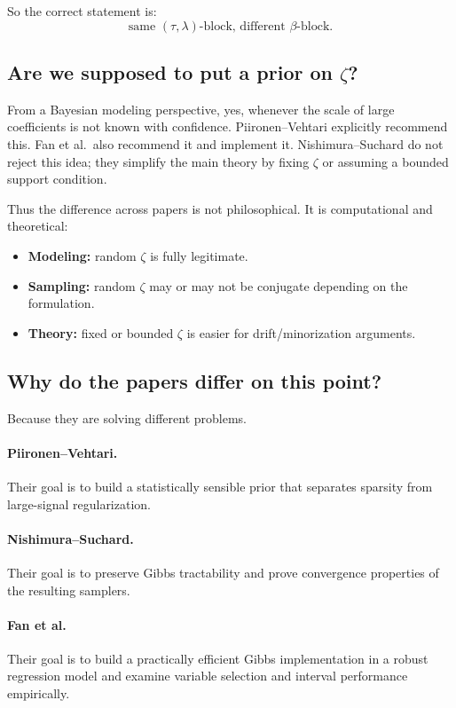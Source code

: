 \documentclass[11pt]{article}
\begin{document}
So the correct statement is:
\[
\text{same } (\tau,\lambda)\text{-block, different }\beta\text{-block.}
\]

\subsection{Are we supposed to put a prior on $\zeta$?}

From a Bayesian modeling perspective, yes, whenever the scale of large coefficients is not known with confidence. Piironen--Vehtari explicitly recommend this. Fan et al.\ also recommend it and implement it. Nishimura--Suchard do not reject this idea; they simplify the main theory by fixing $\zeta$ or assuming a bounded support condition.

Thus the difference across papers is not philosophical. It is computational and theoretical:
\begin{itemize}
\item \textbf{Modeling:} random $\zeta$ is fully legitimate.
\item \textbf{Sampling:} random $\zeta$ may or may not be conjugate depending on the formulation.
\item \textbf{Theory:} fixed or bounded $\zeta$ is easier for drift/minorization arguments.
\end{itemize}

\subsection{Why do the papers differ on this point?}

Because they are solving different problems.

\paragraph{Piironen--Vehtari.}
Their goal is to build a statistically sensible prior that separates sparsity from large-signal regularization.

\paragraph{Nishimura--Suchard.}
Their goal is to preserve Gibbs tractability and prove convergence properties of the resulting samplers.

\paragraph{Fan et al.}
Their goal is to build a practically efficient Gibbs implementation in a robust regression model and examine variable selection and interval performance empirically.
\end{document}
